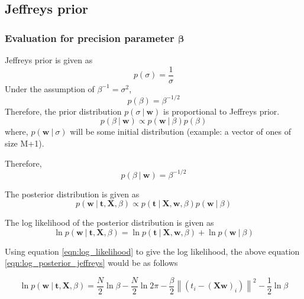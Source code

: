 \documentclass[11pt]{article}
\newcommand\given[1][]{\:#1\vert\:}
\newcommand{\norm}[1]{\left\lVert#1\right\rVert}
\begin{document}
\subsection{Jeffreys prior}
\subsubsection{Evaluation for precision parameter $\bm{\beta}$}
Jeffreys prior is given as
\begin{equation}
    p(\sigma) = \frac{1}{\sigma} 
\end{equation}
Under the assumption of $\beta^{-1} = \sigma^2$,
\begin{equation}
    p(\beta) = \beta^{-1/2}
\end{equation}
Therefore, the prior distribution $p(\sigma \given \bm{w})$ is proportional to Jeffreys prior.
\begin{equation}
    p(\beta \given \bm{w}) \propto p(\bm{w}\given \beta)p(\beta)
\end{equation}
where, $p(\bm{w}\given \sigma)$ will be some initial distribution (example: a vector of ones of size M+1). 

Therefore,
\begin{equation}
    p(\beta \given \bm{w}) = \beta^{-1/2}
\end{equation}

The posterior distribution is given as
\begin{equation}
    p(\bm{w} \given \bm{t}, \bm{X}, \beta) \propto p(\bm{t} \given \bm{X}, \bm{w}, \beta) p(\bm{w}\given \beta)
\end{equation}

The log likelihood of the posterior distribution is given as
\begin{equation} \label{eqn:log_posterior_jeffreys}
    \ln{p(\bm{w} \given \bm{t}, \bm{X}, \beta)} = \ln{p(\bm{t} \given \bm{X}, \bm{w}, \beta)} + \ln{p(\bm{w}\given \beta)}
\end{equation}

\newpage
Using equation \ref{eqn:log_likelihood} to give the log likelihood, the above equation \ref{eqn:log_posterior_jeffreys} would be as follows

\begin{equation} \label{eqn:log_posterior_jeffreys}
    \ln{p(\bm{w} \given \bm{t}, \bm{X}, \beta)} = \frac{N}{2}\ln{\beta} - \frac{N}{2}\ln{2\pi} - \frac{\beta}{2} \norm{\left(t_i - (\bm{X}\bm{w})_i\right)}^2 - \frac{1}{2}\ln{\beta}
\end{equation}
\end{document}
